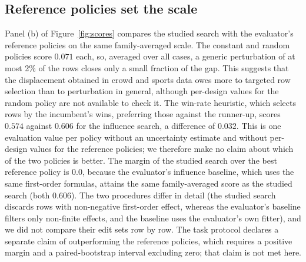 \documentclass{article}
\begin{document}
\subsection{Reference policies set the scale}
Panel (b) of Figure~\ref{fig:scores} compares the studied search with the evaluator's reference policies on the same family-averaged scale. The constant and random policies score $0.071$ each, so, averaged over all cases, a generic perturbation of at most 2\% of the rows closes only a small fraction of the gap. This suggests that the displacement obtained in crowd and sports data owes more to targeted row selection than to perturbation in general, although per-design values for the random policy are not available to check it. %
The win-rate heuristic, which selects rows by the incumbent's wins, preferring those against the runner-up, scores $0.574$ against $0.606$ for the influence search, a difference of $0.032$. %
This is one evaluation value per policy without an uncertainty estimate and without per-design values for the reference policies; we therefore make no claim about which of the two policies is better. The margin of the studied search over the best reference policy is $0.0$, because the evaluator's influence baseline, which uses the same first-order formulas, attains the same family-averaged score as the studied search (both $0.606$). The two procedures differ in detail (the studied search discards rows with non-negative first-order effect, whereas the evaluator's baseline filters only non-finite effects, and the baseline uses the evaluator's own fitter), and we did not compare their edit sets row by row. %
The task protocol declares a separate claim of outperforming the reference policies, which requires a positive margin and a paired-bootstrap interval excluding zero; that claim is not met here. %
\end{document}
